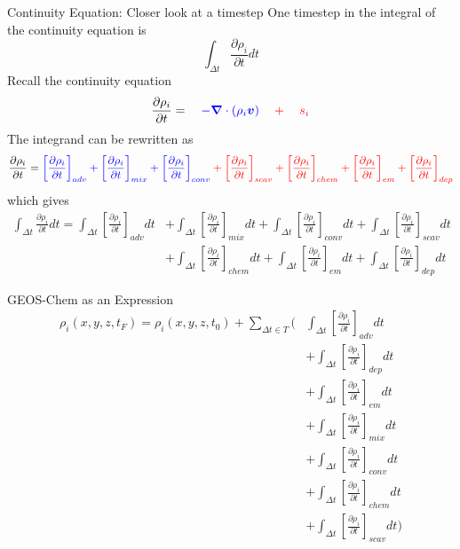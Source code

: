 \documentclass[10pt]{beamer}
\begin{document}
\begin{frame}[fragile]{Continuity Equation: Closer look at a timestep}
    One timestep in the integral of the continuity equation is
    $$\int_{\Delta t} \frac{\partial \rho_i}{\partial t} dt$$
    Recall the continuity equation
    $$
        \frac{\partial \rho_i}{\partial t} =   \quad \color{blue} -\boldsymbol \nabla \cdot (\rho_i \boldsymbol v) \quad \color{red} + \quad s_i
    $$
    \normalsize
    The integrand can be rewritten as
    \tiny
    $$
        \frac{\partial \rho_i}{\partial t} = 
        \color{blue}
        \left[ \frac{\partial \rho_i}{\partial t} \right]_{adv} + 
        \left[ \frac{\partial \rho_i}{\partial t} \right]_{mix} + 
        \left[ \frac{\partial \rho_i}{\partial t} \right]_{conv} \color{red} + 
        \left[ \frac{\partial \rho_i}{\partial t} \right]_{scav} + 
        \left[ \frac{\partial \rho_i}{\partial t} \right]_{chem} + 
        \left[ \frac{\partial \rho_i}{\partial t} \right]_{em} + 
        \left[ \frac{\partial \rho_i}{\partial t} \right]_{dep}
    $$
    \normalsize
    which gives
    \tiny
    \begin{align*}
        \int_{\Delta t}\frac{\partial \rho_i}{\partial t} dt = 
        \int_{\Delta t}\left[ \frac{\partial \rho_i}{\partial t} \right]_{adv} dt 
        & + \int_{\Delta t}\left[ \frac{\partial \rho_i}{\partial t} \right]_{mix} dt + 
        \int_{\Delta t}\left[ \frac{\partial \rho_i}{\partial t} \right]_{conv} dt +
        \int_{\Delta t}\left[ \frac{\partial \rho_i}{\partial t} \right]_{scav} dt \\ 
        & + \int_{\Delta t}\left[ \frac{\partial \rho_i}{\partial t} \right]_{chem} dt + 
        \int_{\Delta t}\left[ \frac{\partial \rho_i}{\partial t} \right]_{em} dt + 
        \int_{\Delta t}\left[ \frac{\partial \rho_i}{\partial t} \right]_{dep} dt
    \end{align*}
\end{frame}

\begin{frame}[fragile]{GEOS-Chem as an Expression}
    \small
    \begin{align*}
        \rho_i(x, y, z, t_F) = \rho_i(x, y, z, t_0) + \sum_{\Delta t \in T} (
        & \int_{\Delta t}\left[ \frac{\partial \rho_i}{\partial t} \right]_{adv} dt \\& + 
        \int_{\Delta t}\left[ \frac{\partial \rho_i}{\partial t} \right]_{dep} dt \\ & + 
        \int_{\Delta t}\left[ \frac{\partial \rho_i}{\partial t} \right]_{em} dt \\& +
        \int_{\Delta t}\left[ \frac{\partial \rho_i}{\partial t} \right]_{mix} dt \\ & + 
        \int_{\Delta t}\left[ \frac{\partial \rho_i}{\partial t} \right]_{conv} dt \\& +
        \int_{\Delta t}\left[ \frac{\partial \rho_i}{\partial t} \right]_{chem} dt \\ & + 
        \int_{\Delta t}\left[ \frac{\partial \rho_i}{\partial t} \right]_{scav} dt )
    \end{align*}
\end{frame}
\end{document}
